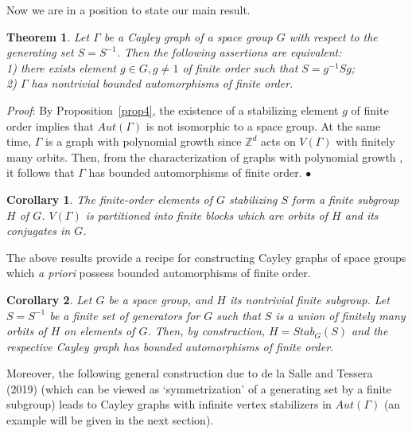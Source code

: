 \documentclass[11pt,a4paper]{article}
\newtheorem{theorem}{Theorem}
\newtheorem{corollary}{Corollary}
\newenvironment{proof}    {{\noindent \it Proof}:}{{\fillbox \medskip}} %
\newcommand{\fillbox}{\mbox{$\bullet$}}
\newcommand{\Z}{\mathbb Z}
\begin{document}
\medskip

\noindent Now we are in a position to state our main result.

\begin{theorem}
\label{teo1}
Let $\Gamma$ be a Cayley graph of a space group $G$ with respect to the generating set $S = S^{-1}$. Then the following assertions are equivalent:\\
1) there exists element $g \in G, g \neq 1$ of finite order such that $S = g^{-1}Sg$;\\
2) $\Gamma$ has nontrivial bounded automorphisms of finite order. 
\end{theorem}

\begin{proof} By Proposition~\ref{prop4}, the existence of a stabilizing element $g$ of finite order implies that $Aut(\Gamma)$ is not isomorphic to a space group. At the same time, $\Gamma$ is a graph with polynomial growth since $\Z^d$ acts on $V(\Gamma)$ with finitely many orbits. Then, from the characterization of graphs with polynomial growth \cite{Trofimov84}, it follows that $\Gamma$ has bounded automorphisms of finite order.
\end{proof}

\begin{corollary}
\label{cor1}
The finite-order elements of $G$ stabilizing $S$ form a finite subgroup $H$ of $G$. $V(\Gamma)$ is partitioned into finite blocks which are orbits of $H$ and its conjugates in $G$.
\end{corollary}

\medskip

\noindent The above results provide a recipe for constructing Cayley graphs of space groups which \emph{a priori} possess bounded automorphisms of finite order.

\begin{corollary}
\label{cor2}
Let $G$ be a space group, and $H$ its nontrivial finite subgroup. Let $S=S^{-1}$ be a finite set of generators for $G$ such that $S$ is a union of finitely many orbits of $H$ on elements of $G$. Then, by construction, $H = Stab_G(S)$ and the respective Cayley graph has bounded automorphisms of finite order.
\end{corollary}

\noindent Moreover, the following general construction due to de la Salle and Tessera (2019) (which can be viewed as `symmetrization' of a generating set by a finite subgroup) leads to Cayley graphs with infinite vertex stabilizers in $Aut(\Gamma)$ (an example will be given in the next section).
\end{document}
